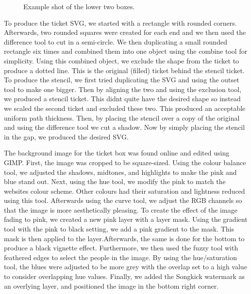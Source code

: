\documentclass[10pt]{article}
\begin{document}
                \begin{figure}[!ht]
                  \centering
                  \caption{Example shot of the lower two boxes.}
                \end{figure}

                To produce the ticket SVG, we started with a rectangle with rounded corners. Afterwards, two rounded squares were created for each end and we then used the difference tool to cut in a semi-circle. We then duplicating a small rounded rectangle six times and combined them into one object using the combine tool for simplicity. Using this combined object, we exclude the shape from the ticket to produce a dotted line. This is the original (filled) ticket behind the stencil ticket. To produce the stencil, we first tried duplicating the SVG and using the outset tool to make one bigger. Then by aligning the two and using the exclusion tool, we produced a stencil ticket. This didn\textquotesingle t quite have the desired shape so instead we scaled the second ticket and excluded these two. This produced an acceptable uniform path thickness. Then, by placing the stencil over a copy of the original and using the difference tool we cut a shadow. Now by simply placing the stencil in the gap, we produced the desired SVG. 


                The background image for the ticket box was found online and edited using GIMP. First, the image was cropped to be square-sized. Using the colour balance tool, we adjusted the shadows, midtones, and highlights to make the pink and blue stand out. Next, using the hue tool, we modify the pink to match the website\textquotesingle s colour scheme. Other colours had their saturation and lightness reduced using this tool. Afterwards using the curve tool, we adjust the RGB channels so that the image is more aesthetically pleasing. To create the effect of the image fading to pink, we created a new pink layer with a layer mask. Using the gradient tool with the pink to black setting, we add a pink gradient to the mask. This mask is then applied to the layer.Afterwards, the same is done for the bottom to produce a black vignette effect. Furthermore, we then used the fuzzy tool with feathered edges to select the people in the image. By using the hue/saturation tool, the blues were adjusted to be more grey with the overlap set to a high value to consider overlapping hue values. Finally, we added the Songkick watermark as an overlying layer, and positioned the image in the bottom right corner.
\end{document}
